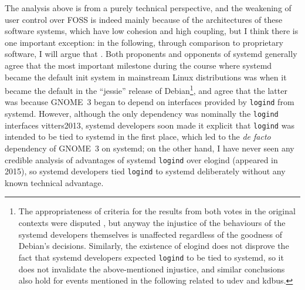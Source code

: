 The analysis above is from a purely technical perspective, and the weakening
of user control over FOSS is indeed mainly because of the architectures of these
software systems, which have low cohesion and high coupling, but I think there
is one important exception: in the following, through comparison to proprietary
software, I will argue that .  Both proponents and
opponents of systemd generally agree that the most important milestone
during the course where systemd became the default init system in mainstream
Linux distributions was when it became the default in the ``jessie'' release
of Debian\footnote{The appropriateness of
criteria for the results from both votes in the original contexts were disputed%
, but anyway the injustice of the behaviours
of the systemd developers themselves is unaffected regardless of the goodness
of Debian's decisions.  Similarly, the existence of elogind does not disprove
the fact that systemd developers expected \texttt{logind} to be tied to systemd,
so it does not invalidate the above-mentioned injustice, and similar conclusions
also hold for events mentioned in the following related to udev and kdbus.},
and agree that the latter was because GNOME~3 began to depend on interfaces
provided by \verb|logind| from systemd.  However, although
the only dependency was nominally the \verb|logind| interfaces\cupercite%
{vitters2013}, systemd developers soon made it explicit that \verb|logind| was
intended to be tied to systemd in the first place,
which led to the \emph{de facto} dependency of GNOME~3 on systemd; on the
other hand, I have never seen any credible analysis of advantages of systemd
\verb|logind| over elogind (appeared in 2015), so systemd developers tied
\verb|logind| to systemd deliberately without any known technical advantage.

